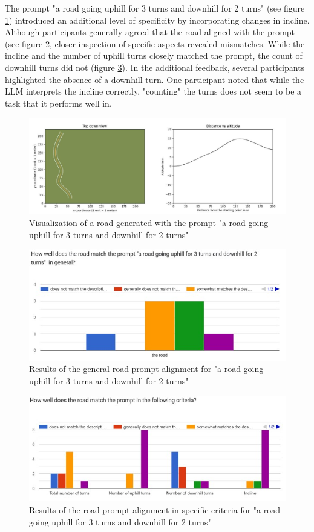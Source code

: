 The prompt "a road going uphill for 3 turns and downhill for 2 turns" (see figure \ref{u3t-d2t-vis}) introduced an additional level of specificity by incorporating changes in incline. Although participants generally agreed that the road aligned with the prompt (see figure \ref{u3t-d2t-general}, closer inspection of specific aspects revealed mismatches. While the incline and the number of uphill turns closely matched the prompt, the count of downhill turns did not (figure \ref{u3t-d2t-specific}). In the additional feedback, several participants highlighted the absence of a downhill turn. One participant noted that while the LLM interprets the incline correctly, "counting" the turns does not seem to be a task that it performs well in.

\begin{figure}[H]
    \centering
    \includegraphics[width=0.75\linewidth]{images/u3t_d2t_vis.jpg}
    \caption{Visualization of a road generated with the prompt "a road going uphill for 3 turns and downhill for 2 turns"}
    \label{u3t-d2t-vis}
\end{figure}

\begin{figure}[H]
    \centering
    \includegraphics[width=0.75\linewidth]{images/u3t_d2t_general.jpg}
    \caption{Results of the general road-prompt alignment for "a road going uphill for 3 turns and downhill for 2 turns"}
    \label{u3t-d2t-general}
\end{figure}

\begin{figure}[H]
    \centering
    \includegraphics[width=0.75\linewidth]{images/u3t_d2t_specific.jpg}
    \caption{Results of the road-prompt alignment in specific criteria for "a road going uphill for 3 turns and downhill for 2 turns"}
    \label{u3t-d2t-specific}
\end{figure}

